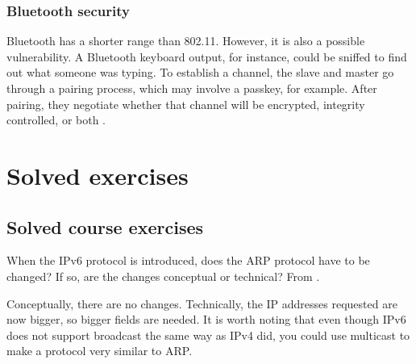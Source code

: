 \subsubsection{Bluetooth security}

Bluetooth has a shorter range than 802.11. However, it is also a possible vulnerability.
A Bluetooth keyboard output, for instance, could be sniffed to find out what someone was typing.
To establish a channel, the slave and master go through a pairing process, which may involve a passkey, for example.
After pairing, they negotiate whether that channel will be encrypted, integrity controlled, or both \cite[p.~827]{computer-networks-tanenbaum-2012}.

\section{Solved exercises}

\subsection{Solved course exercises}
\setcounter{Exercise}{0}

\begin{Exercise}
When the IPv6 protocol is introduced, does the ARP protocol have to be changed?
If so, are the changes conceptual or technical?
From \cite{computer-networks-tanenbaum-2012}.
\end{Exercise}
\begin{Answer}
Conceptually, there are no changes.
Technically, the IP addresses requested are now bigger, so bigger fields are needed.
It is worth noting that even though IPv6 does not support broadcast the same way as IPv4 did, you could use multicast to make a protocol very similar to ARP.
\end{Answer}


